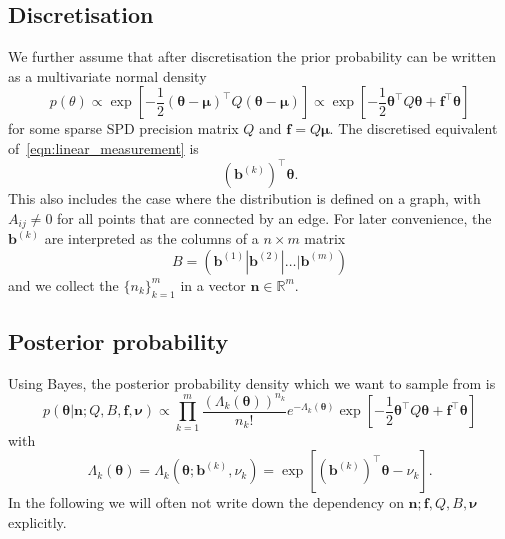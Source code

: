 \documentclass[11pt]{article}
\renewcommand{\vec}[1]{\boldsymbol{#1}}
\begin{document}
\subsection{Discretisation}
We further assume that after discretisation the prior probability can be written as a multivariate normal density
\begin{equation}
p(\theta) \propto \exp\left[-\frac{1}{2}(\vec{\theta}-\vec{\mu})^\top Q(\vec{\theta}-\vec{\mu})\right] \propto \exp\left[-\frac{1}{2}\vec{\theta}^\top Q\vec{\theta}+\vec{f}^\top\vec{\theta}\right]
\end{equation}
for some sparse SPD precision matrix $Q$ and $\vec{f}=Q\vec{\mu}$. The discretised equivalent of~\eqref{eqn:linear_measurement} is 
\begin{equation}
(\vec{b}^{(k)})^\top\vec{\theta}.
\end{equation}
This also includes the case where the distribution is defined on a graph, with $A_{ij}\ne 0$ for all points that are connected by an edge. For later convenience, the $\vec{b}^{(k)}$ are interpreted as the columns of a $n\times m$ matrix
\begin{equation}
    B = (\vec{b}^{(1)}|\vec{b}^{(2)}|\dots|\vec{b}^{(m)})
\end{equation}
and we collect the $\{n_k\}_{k=1}^{m}$ in a vector $\vec{n}\in\mathbb{R}^m$.
\subsection{Posterior probability}
Using Bayes, the posterior probability density which we want to sample from is
\begin{equation}
    p(\vec{\theta}|\vec{n};Q,B,\vec{f},\vec{\nu}) \propto \prod_{k=1}^m \frac{(\Lambda_k(\vec{\theta}))^{n_k}}{n_k!}e^{-\Lambda_k(\vec{\theta})} \exp\left[-\frac{1}{2}\vec{\theta}^\top Q\vec{\theta}+\vec{f}^\top\vec{\theta} \right]\label{eqn:posterior_density}
\end{equation}
with
\begin{equation}
\Lambda_k(\vec{\theta}) = \Lambda_k(\vec{\theta};\vec{b}^{(k)},\nu_k) = \exp\left[(\vec{b}^{(k)})^\top \vec{\theta} - \nu_k\right].
\end{equation}
In the following we will often not write down the dependency on $\vec{n};\vec{f},Q,B,\vec{\nu}$ explicitly.
\end{document}
